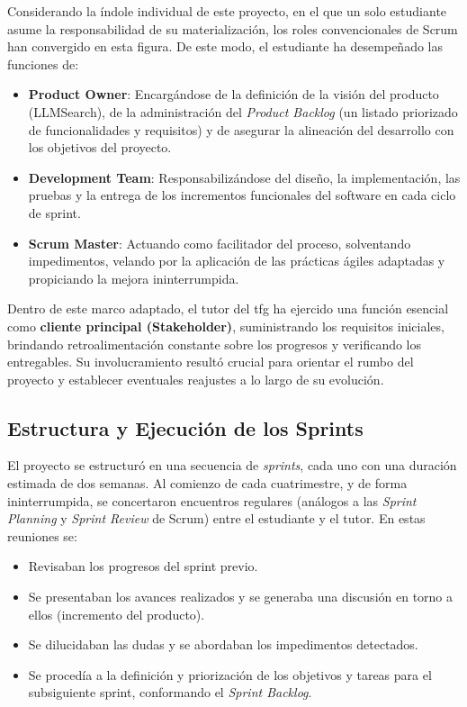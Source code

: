 Considerando la índole individual de este proyecto, en el que un solo estudiante asume la responsabilidad de su materialización, los roles convencionales de Scrum han convergido en esta figura. De este modo, el estudiante ha desempeñado las funciones de:
\begin{itemize}
    \item \textbf{Product Owner}: Encargándose de la definición de la visión del producto (LLMSearch), de la administración del \textit{Product Backlog} (un listado priorizado de funcionalidades y requisitos) y de asegurar la alineación del desarrollo con los objetivos del proyecto.
    \item \textbf{Development Team}: Responsabilizándose del diseño, la implementación, las pruebas y la entrega de los incrementos funcionales del software en cada ciclo de sprint.
    \item \textbf{Scrum Master}: Actuando como facilitador del proceso, solventando impedimentos, velando por la aplicación de las prácticas ágiles adaptadas y propiciando la mejora ininterrumpida.
\end{itemize}
Dentro de este marco adaptado, el tutor del \gls{tfg} ha ejercido una función esencial como \textbf{cliente principal (Stakeholder)}, suministrando los requisitos iniciales, brindando retroalimentación constante sobre los progresos y verificando los entregables. Su involucramiento resultó crucial para orientar el rumbo del proyecto y establecer eventuales reajustes a lo largo de su evolución.

\subsection{Estructura y Ejecución de los Sprints}
\label{subsec:sprints}

El proyecto se estructuró en una secuencia de \textit{sprints}, cada uno con una duración estimada de dos semanas. Al comienzo de cada cuatrimestre, y de forma ininterrumpida, se concertaron encuentros regulares (análogos a las \textit{Sprint Planning} y \textit{Sprint Review} de Scrum) entre el estudiante y el tutor. En estas reuniones se:
\begin{itemize}
    \item Revisaban los progresos del sprint previo.
    \item Se presentaban los avances realizados y se generaba una discusión en torno a ellos (incremento del producto).
    \item Se dilucidaban las dudas y se abordaban los impedimentos detectados.
    \item Se procedía a la definición y priorización de los objetivos y tareas para el subsiguiente sprint, conformando el \textit{Sprint Backlog}.
\end{itemize}

